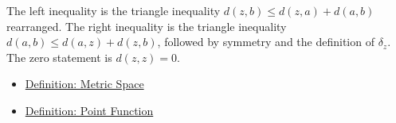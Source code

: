 \begin{remark*}
The left inequality is the triangle inequality
\(d(z,b)\leq d(z,a)+d(a,b)\) rearranged.  The right inequality is the
triangle inequality \(d(a,b)\leq d(a,z)+d(z,b)\), followed by symmetry and the
definition of \(\delta_z\).  The zero statement is \(d(z,z)=0\).
\end{remark*}

\begin{dependencies}
\begin{itemize}
  \item \hyperref[def:metric-space]{Definition: Metric Space}
  \item \hyperref[def:metric-point-function]{Definition: Point Function}
\end{itemize}
\end{dependencies}

\clearpage
